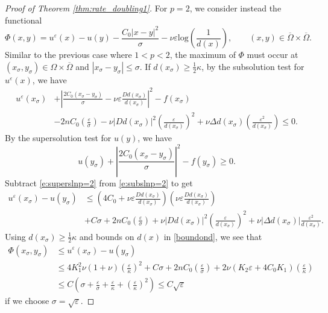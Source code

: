 \documentclass[12pt,reqno]{amsart}
\numberwithin{figure}{section}
\theoremstyle{plain}
\theoremstyle{remark}
\numberwithin{equation}{section}
\begin{document}
\begin{proof}[Proof of Theorem \ref{thm:rate_doubling1}]
\noindent For $p=2$, we consider instead the functional 
\begin{equation*}
    \Phi(x,y) = u^\varepsilon(x) - u(y) - \frac{C_0|x-y|^2}{\sigma} - \nu \varepsilon \mathrm{log}\left(\frac{1}{d(x)}\right), \qquad (x,y)\in \overline{\Omega}\times \overline{\Omega}.
\end{equation*}
Similar to the previous case where $1<p<2$, the maximum of $\Phi$ must occur at $(x_\sigma,y_\sigma)\in \Omega\times\overline{\Omega}$ and $|x_\sigma - y_\sigma|\leq \sigma$. If $d(x_\sigma)\geq \frac{1}{2}\kappa$, by the subsolution test for $u^\varepsilon(x)$, we have
\begin{align}\label{e:subslnp=2}
    u^\varepsilon(x_\sigma)&+ \left|\frac{2C_0(x_\sigma - y_\sigma)}{\sigma} - \nu \varepsilon \frac{D d(x_\sigma)}{d(x_\sigma)}\right|^2  -f(x_\sigma) \nonumber\\
    &- 2nC_0\left(\frac{\varepsilon}{\sigma}\right) - \nu |D d(x_\sigma)|^2 \left(\frac{\varepsilon}{d(x_\sigma)}\right)^2  + \nu \Delta d(x_\sigma)\left(\frac{\varepsilon^2}{d(x_\sigma)}\right) \leq 0.
\end{align}
By the supersolution test for $u(y)$, we have
\begin{equation}\label{e:superslnp=2}
    u(y_\sigma) + \left|\frac{2C_0(x_\sigma - y_\sigma)}{\sigma}\right|^2 - f(y_\sigma) \geq 0.
\end{equation}
Subtract \eqref{e:superslnp=2} from \eqref{e:subslnp=2} to get
\begin{align*}
    u^\varepsilon(x_\sigma) - u(y_\sigma) &\leq \left(4C_0+ \nu\varepsilon\frac{D d(x_\sigma)}{d(x_\sigma)}\right)\left(\nu \varepsilon \frac{ D d(x_\sigma)}{d(x_\sigma)}\right) \\
    &+ C\sigma + 2nC_0 \left(\frac{\varepsilon}{\sigma}\right)+ \nu |D d(x_\sigma)|^2 \left(\frac{\varepsilon}{d(x_\sigma)}\right)^2 + \nu|\Delta d(x_\sigma)| \frac{\varepsilon^2}{d(x_\sigma)}.
\end{align*}
Using $d(x_\sigma)\geq \frac{1}{2}\kappa$ and bounds on $d(x)$ in \eqref{boundond}, we see that
\begin{align}\label{p=2a}
    \Phi(x_\sigma,y_\sigma)&\leq u^\varepsilon(x_\sigma) - u(y_\sigma)\nonumber \\
    &\leq 4K_1^2\nu(1+\nu)\left(\frac{\varepsilon}{\kappa}\right)^2 + C\sigma + 2nC_0\left( \frac{\varepsilon}{\sigma}\right) + 2\nu(K_2\varepsilon+4C_0K_1)\left(\frac{\varepsilon}{\kappa}\right)\nonumber\\
    &\leq C\left(\sigma+\frac{\varepsilon}{\sigma} + \frac{\varepsilon}{\kappa} + \left(\frac{\varepsilon}{\kappa}\right)^2\right) \leq C\sqrt{\varepsilon}
\end{align}
if we choose $\sigma = \sqrt{\varepsilon}$. 


\end{proof}
\end{document}
